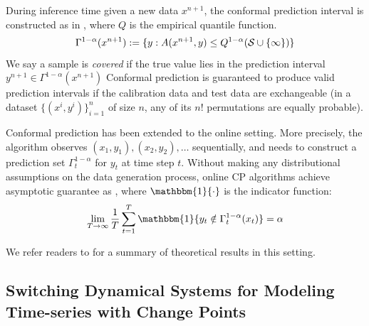 %
During inference time given a new data  $x^{n+1}$, the conformal prediction interval is constructed as in , where $Q$ is the empirical quantile function. 
%
\begin{equation}
    \Gamma^{1-\alpha}(x^{n+1}):=  \{ y : A(x^{n+1}, y) \leq Q^{1-\alpha}({\mathcal{S}} \cup \{\infty\})\}  
    \label{eq:region}
\end{equation}
%
We say a sample is \textit{covered} if the true value lies in the prediction interval $y^{n+1} \in \Gamma^{1-\alpha}(x^{n+1})$ %
Conformal prediction is guaranteed to produce valid prediction intervals \citep{vovk2005algorithmic} if the calibration data and test data are exchangeable (in a dataset $\{(x^i, y^i)\}_{i=1}^n$ of size  $n$, any of its $n$! permutations are equally probable).


Conformal prediction has been extended to the online setting. More precisely, the algorithm observes $(x_1, y_1), (x_2, y_2), \ldots$ sequentially, and needs to construct a prediction set $ \Gamma^{1-\alpha}_t$ for $y_t$ at time step $t$. Without making any distributional assumptions on the data generation process, online CP algorithms achieve asymptotic guarantee as , where $\mathbbm{1}\{\cdot\}$ is the indicator function:
\vspace{-0.5em}
\begin{equation}
\lim_{T \to \infty} \frac{1}{T} \sum_{t=1}^T \mathbbm{1}\{ y_t \notin \Gamma^{1-\alpha}_t(x_t) \} = \alpha  \label{eq:aci_convergence}
\end{equation}

\vspace{-1em}
We refer readers to \cite{angelopoulos2024theoretical} for a summary of theoretical results in this setting.


\subsection{Switching Dynamical Systems for Modeling Time-series with Change Points}
\label{background:sds}


